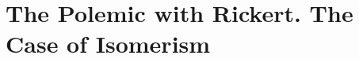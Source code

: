 \documentclass[submitted,12pt]{article}
\renewcommand{\SF}[2]{\citep[#1/#2]{Cassirer1910}}
\renewcommand{\PSF}[2]{\citep[#1/#2]{Cassirer1929}}
\begin{document}

\section{The Polemic with Rickert. The Case of Isomerism}
\label{sec:rickert}
\end{document}
